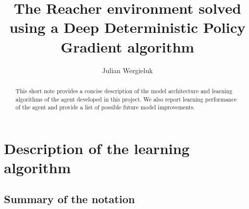 \documentclass[a4paper,12pt]{amsart}
\title[Deep Deterministic Policy Gradients]{The Reacher environment solved using a Deep Deterministic Policy Gradient algorithm}
\author{Julian Wergieluk}\address{}\email{julian.wergieluk@risklab.com}
\begin{document}
\maketitle

\begin{abstract}
This short note provides a concise description of the model architecture and
learning algorithms of the agent developed in this project. We also report learning
performance of the agent and provide a list of possible future model improvements.
\end{abstract}


\section{Description of the learning algorithm}

\subsection{Summary of the notation}

\end{document}
